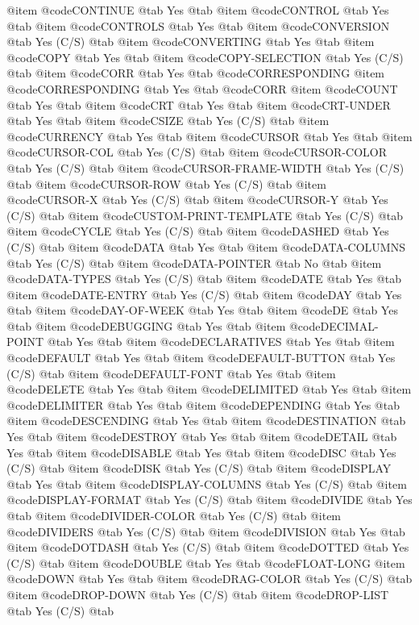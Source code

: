 @item @code{CONTINUE} @tab Yes @tab 
@item @code{CONTROL} @tab Yes @tab 
@item @code{CONTROLS} @tab Yes @tab 
@item @code{CONVERSION} @tab Yes	(C/S) @tab 
@item @code{CONVERTING} @tab Yes @tab 
@item @code{COPY} @tab Yes @tab 
@item @code{COPY-SELECTION} @tab Yes	(C/S) @tab 
@item @code{CORR} @tab Yes @tab @code{CORRESPONDING}
@item @code{CORRESPONDING} @tab Yes @tab @code{CORR}
@item @code{COUNT} @tab Yes @tab 
@item @code{CRT} @tab Yes @tab 
@item @code{CRT-UNDER} @tab Yes @tab 
@item @code{CSIZE} @tab Yes	(C/S) @tab 
@item @code{CURRENCY} @tab Yes @tab 
@item @code{CURSOR} @tab Yes @tab 
@item @code{CURSOR-COL} @tab Yes	(C/S) @tab 
@item @code{CURSOR-COLOR} @tab Yes	(C/S) @tab 
@item @code{CURSOR-FRAME-WIDTH} @tab Yes	(C/S) @tab 
@item @code{CURSOR-ROW} @tab Yes	(C/S) @tab 
@item @code{CURSOR-X} @tab Yes	(C/S) @tab 
@item @code{CURSOR-Y} @tab Yes	(C/S) @tab 
@item @code{CUSTOM-PRINT-TEMPLATE} @tab Yes	(C/S) @tab 
@item @code{CYCLE} @tab Yes	(C/S) @tab 
@item @code{DASHED} @tab Yes	(C/S) @tab 
@item @code{DATA} @tab Yes @tab 
@item @code{DATA-COLUMNS} @tab Yes	(C/S) @tab 
@item @code{DATA-POINTER} @tab No @tab 
@item @code{DATA-TYPES} @tab Yes	(C/S) @tab 
@item @code{DATE} @tab Yes @tab 
@item @code{DATE-ENTRY} @tab Yes	(C/S) @tab 
@item @code{DAY} @tab Yes @tab 
@item @code{DAY-OF-WEEK} @tab Yes @tab 
@item @code{DE} @tab Yes @tab 
@item @code{DEBUGGING} @tab Yes @tab 
@item @code{DECIMAL-POINT} @tab Yes @tab 
@item @code{DECLARATIVES} @tab Yes @tab 
@item @code{DEFAULT} @tab Yes @tab 
@item @code{DEFAULT-BUTTON} @tab Yes	(C/S) @tab 
@item @code{DEFAULT-FONT} @tab Yes @tab 
@item @code{DELETE} @tab Yes @tab 
@item @code{DELIMITED} @tab Yes @tab 
@item @code{DELIMITER} @tab Yes @tab 
@item @code{DEPENDING} @tab Yes @tab 
@item @code{DESCENDING} @tab Yes @tab 
@item @code{DESTINATION} @tab Yes @tab 
@item @code{DESTROY} @tab Yes @tab 
@item @code{DETAIL} @tab Yes @tab 
@item @code{DISABLE} @tab Yes @tab 
@item @code{DISC} @tab Yes	(C/S) @tab 
@item @code{DISK} @tab Yes	(C/S) @tab 
@item @code{DISPLAY} @tab Yes @tab 
@item @code{DISPLAY-COLUMNS} @tab Yes	(C/S) @tab 
@item @code{DISPLAY-FORMAT} @tab Yes	(C/S) @tab 
@item @code{DIVIDE} @tab Yes @tab 
@item @code{DIVIDER-COLOR} @tab Yes	(C/S) @tab 
@item @code{DIVIDERS} @tab Yes	(C/S) @tab 
@item @code{DIVISION} @tab Yes @tab 
@item @code{DOTDASH} @tab Yes	(C/S) @tab 
@item @code{DOTTED} @tab Yes	(C/S) @tab 
@item @code{DOUBLE} @tab Yes @tab @code{FLOAT-LONG}
@item @code{DOWN} @tab Yes @tab 
@item @code{DRAG-COLOR} @tab Yes	(C/S) @tab 
@item @code{DROP-DOWN} @tab Yes	(C/S) @tab 
@item @code{DROP-LIST} @tab Yes	(C/S) @tab 

